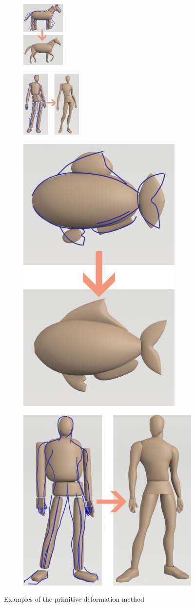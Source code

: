 \documentclass[runningheads]{llncs}
\begin{document}
\begin{figure}[!htbp]
    \centering
    \begin{subfigure}[p]{.2\linewidth}
    \includegraphics[height=1.3in]{horse_before_and_after.jpg}
    \caption{}
    \label{fig:horse}
    \end{subfigure}
    \begin{subfigure}[p]{.25\linewidth}
    \includegraphics[height=1.3in]{female_primitives_before_and_after_deformation.jpg}
    \caption{}
    \label{fig:female}
    \end{subfigure}
    \begin{subfigure}[p]{.2\linewidth}
    \centering
    \includegraphics[height=1.3 in]{fish_before_and_after.jpg}
    \caption{}
    \label{fig:fish}
    \end{subfigure}
    \begin{subfigure}[p]{.2\linewidth}
    \centering
    \includegraphics[height=1.3 in]{male_primitive_before_and_after.jpg}
    \caption{}
    \label{fig:male}
    \end{subfigure}
    \caption{Examples of the primitive deformation method}
    \label{fig:different means to input silhouette}
\end{figure}
\end{document}
